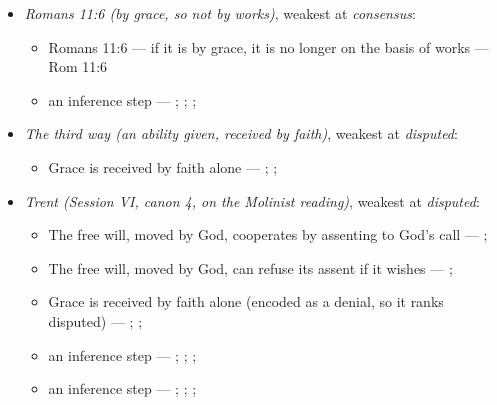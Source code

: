 \documentclass[11pt]{article}
\begin{document}
\begin{itemize}
\begin{itemize}
\end{itemize}
\item \emph{Romans 11:6 (by grace, so not by works)}, weakest at \emph{consensus}:
\begin{itemize}
\item Romans 11:6 — if it is by grace, it is no longer on the basis of works --- Rom 11:6
\item an inference step --- \cite[Trent, Session VI (1547), ch. 8]{tanner-decrees-1990}; \cite[36]{waterworth-trent-1848}; \cite[Five Arminian Articles (1610), art. 4]{schaff-creeds-christendom-3-1977}; \cite[Canons of Dort, III/IV, art. 10]{schaff-creeds-christendom-3-1977}
\end{itemize}
\item \emph{The third way (an ability given, received by faith)}, weakest at \emph{disputed}:
\begin{itemize}
\item Grace is received by faith alone --- \cite[Augsburg Confession IV.1–3]{concordia-triglotta-1921}; \cite[Sermon 1, III.1]{wesley-sermons-1872}; \cite[Trent, Session VI (1547), canon 9]{tanner-decrees-1990}
\end{itemize}
\item \emph{Trent (Session VI, canon 4, on the Molinist reading)}, weakest at \emph{disputed}:
\begin{itemize}
\item The free will, moved by God, cooperates by assenting to God’s call --- \cite[Trent, Session VI (1547), canon 4]{tanner-decrees-1990}; \cite[45]{waterworth-trent-1848}
\item The free will, moved by God, can refuse its assent if it wishes --- \cite[Trent, Session VI (1547), canon 4]{tanner-decrees-1990}; \cite[45]{waterworth-trent-1848}
\item Grace is received by faith alone (encoded as a denial, so it ranks disputed) --- \cite[Augsburg Confession IV.1–3]{concordia-triglotta-1921}; \cite[Sermon 1, III.1]{wesley-sermons-1872}; \cite[Trent, Session VI (1547), canon 9]{tanner-decrees-1990}
\item an inference step --- \cite[I-II q.111 a.2]{aquinas-summa-1920}; \cite[Canons of Dort, III/IV, art. 12]{schaff-creeds-christendom-3-1977}; \cite[Trent, Session VI (1547), canon 4]{tanner-decrees-1990}; \cite[45]{waterworth-trent-1848}
\item an inference step --- \cite[I-II q.10 a.4 ad 3]{aquinas-summa-1920}; \cite[I-II q.112 a.3]{aquinas-summa-1920}; \cite[Trent, Session VI (1547), canon 4]{tanner-decrees-1990}; \cite[45]{waterworth-trent-1848}

\end{itemize}
\end{itemize}
\end{document}
